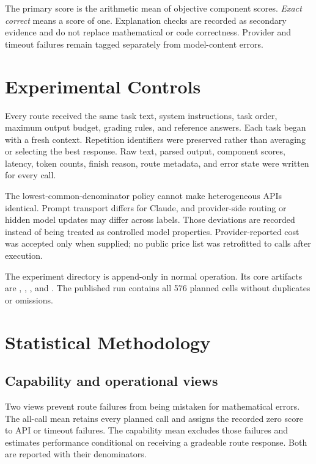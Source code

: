 \documentclass[11pt]{article}
\begin{document}
The primary score is the arithmetic mean of objective component scores. \emph{Exact correct} means a score of one. Explanation checks are recorded as secondary evidence and do not replace mathematical or code correctness. Provider and timeout failures remain tagged separately from model-content errors.

\section{Experimental Controls}

Every route received the same task text, system instructions, task order, maximum output budget, grading rules, and reference answers. Each task began with a fresh context. Repetition identifiers were preserved rather than averaging or selecting the best response. Raw text, parsed output, component scores, latency, token counts, finish reason, route metadata, and error state were written for every call.

The lowest-common-denominator policy cannot make heterogeneous APIs identical. Prompt transport differs for Claude, and provider-side routing or hidden model updates may differ across labels. Those deviations are recorded instead of being treated as controlled model properties. Provider-reported cost was accepted only when supplied; no public price list was retrofitted to calls after execution.

The experiment directory is append-only in normal operation. Its core artifacts are , , , and . The published run contains all 576 planned cells without duplicates or omissions.

\section{Statistical Methodology}

\subsection{Capability and operational views}

Two views prevent route failures from being mistaken for mathematical errors. The all-call mean retains every planned call and assigns the recorded zero score to API or timeout failures. The capability mean excludes those failures and estimates performance conditional on receiving a gradeable route response. Both are reported with their denominators.
\end{document}
